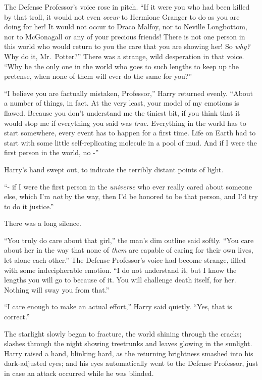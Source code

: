 The Defense Professor's voice rose in pitch. ``If it were you who had
been killed by that troll, it would not even \emph{occur} to Hermione
Granger to do as you are doing for her! It would not occur to Draco
Malfoy, nor to Neville Longbottom, nor to McGonagall or any of your
precious friends! There is not one person in this world who would return
to you the care that you are showing her! So \emph{why?} Why do it,
Mr.~Potter?'' There was a strange, wild desperation in that voice. ``Why
be the only one in the world who goes to such lengths to keep up the
pretense, when none of them will ever do the same for you?''

``I believe you are factually mistaken, Professor,'' Harry returned
evenly. ``About a number of things, in fact. At the very least, your
model of my emotions is flawed. Because you don't understand me the
tiniest bit, if you think that it would stop me if everything you said
was \emph{true.} Everything in the world has to start somewhere, every
event has to happen for a first time. Life on Earth had to start with
some little self-replicating molecule in a pool of mud. And if I were
the first person in the world, no -''

Harry's hand swept out, to indicate the terribly distant points of
light.

``- if I were the first person in the \emph{universe} who ever really
cared about someone else, which I'm \emph{not} by the way, then I'd be
honored to be that person, and I'd try to do it justice.''

There was a long silence.

``You truly do care about that girl,'' the man's dim outline said
softly. ``You care about her in the way that none of \emph{them} are
capable of caring for their own lives, let alone each other.'' The
Defense Professor's voice had become strange, filled with some
indecipherable emotion. ``I do not understand it, but I know the lengths
you will go to because of it. You will challenge death itself, for her.
Nothing will sway you from that.''

``I care enough to make an actual effort,'' Harry said quietly. ``Yes,
that is correct.''

The starlight slowly began to fracture, the world shining through the
cracks; slashes through the night showing treetrunks and leaves glowing
in the sunlight. Harry raised a hand, blinking hard, as the returning
brightness smashed into his dark-adjusted eyes; and his eyes
automatically went to the Defense Professor, just in case an attack
occurred while he was blinded.

